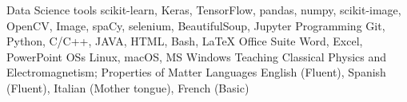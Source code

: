 

\begin{cvskills}
  \cvskill
    {Data Science tools}
    {scikit-learn, Keras, TensorFlow, pandas, numpy, scikit-image, OpenCV, Image, spaCy, selenium, BeautifulSoup, Jupyter}
  \cvskill
    {Programming} %
    {Git, Python, C/C++, JAVA, HTML, Bash, LaTeX} %
  \cvskill
    {Office Suite}
    {Word, Excel, PowerPoint}
  \cvskill
    {OSs}
    {Linux, macOS, MS Windows}
  \cvskill
    {Teaching}
    {Classical Physics and Electromagnetism; Properties of Matter}
  \cvskill
    {Languages} %
    {English (Fluent), Spanish (Fluent), Italian (Mother tongue), French (Basic)} %
\end{cvskills}
